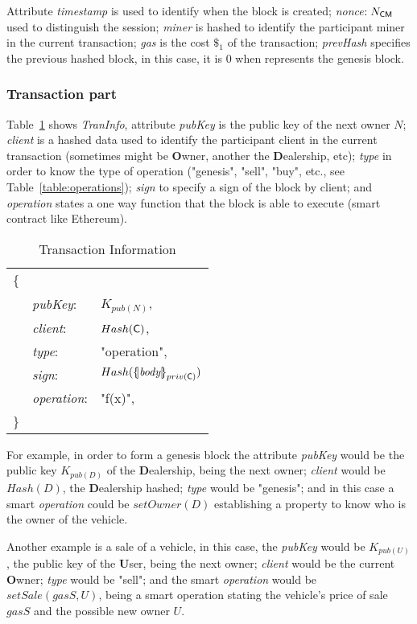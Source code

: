 Attribute \textit{timestamp} is used to identify when the block is created; 
\textit{nonce}$:N_{\textsf{C}\textsf{M}}$ used to distinguish the session; 
\textit{miner} is hashed to identify the participant miner in the current 
transaction;
\textit{gas} is the cost $\$_1$ of the transaction;
\textit{prevHash} specifies the previous hashed block, in this case, it is 0 
when represents the genesis block.

\subsubsection{Transaction part}
Table~\ref{table:TranBlockInfo} shows \textit{TranInfo}, attribute \textit{pubKey} 
is the public key of the next owner $N$; 
\textit{client} is a hashed data used to identify the participant client in the current 
transaction (sometimes might be \textbf{O}wner, another the \textbf{D}ealership, etc); 
\textit{type} in order to know the type of operation ("genesis", "sell", "buy", etc., see Table~\ref{table:operations}); 
\textit{sign} to specify a sign of the block by client; and 
\textit{operation} states a one way function that the block is able to execute (smart contract like Ethereum). 
\begin{table}[ht]
    \centering
    \caption{Transaction Information}
        \begin{tabular}{lll}
            \{  &               &    \\
                & \textit{pubKey}:       & $K_{pub(N)}$, \\
                & \textit{client}:       & $Hash(\textsf{C})$, \\
                & \textit{type}:         & "operation", \\
                & \textit{sign}:         & $Hash(\fat{\textit{body}}_{priv(\Client)})$ \\
                & \textit{operation}:    & "f(x)", \\
            \}  &               &   \\
        \end{tabular}
    \label{table:TranBlockInfo}
\end{table}

For example, in order to form a genesis block the attribute \textit{pubKey} would be the 
public key $K_{pub(D)}$ of the \textbf{D}ealership, being 
the next owner; 
\textit{client} would be $Hash(D)$, the \textbf{D}ealership hashed; 
\textit{type} would be "genesis"; and in this case a 
smart \textit{operation} could be $setOwner(D)$ establishing a property to know who is the
owner of the vehicle.

Another example is a sale of a vehicle, in this case, the \textit{pubKey} 
would be $K_{pub(U)}$, the public key of the \textbf{U}ser, being the next owner; 
\textit{client} would be the current \textbf{O}wner; 
\textit{type} would be "sell"; 
and the smart \textit{operation} would be $setSale(\textit{gasS}, U)$, being a smart operation
stating the vehicle's price of sale $gasS$ and the possible new owner $U$.